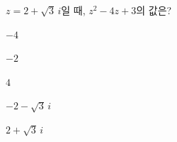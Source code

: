 $z=2+\sqrt{3}\,i$일 때, $z^2-4z+3$의 값은?
\begin{choices32}{\rule[-3ex]{0pt}{8ex}$-4$}{\rule[-3ex]{0pt}{8ex}$-2$}{\rule[-3ex]{0pt}{8ex}$4$}{\rule[-3ex]{0pt}{8ex}$-2-\sqrt{3}\,i$}{\rule[-3ex]{0pt}{8ex}$2+\sqrt{3}\,i$}\end{choices32}
